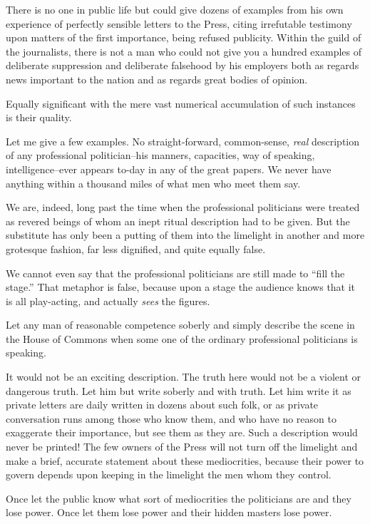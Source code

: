 \documentclass{book}
\begin{document}
There is no one in public life but could give dozens of examples from his own experience of perfectly sensible letters to the Press, citing irrefutable testimony upon matters of the first importance, being refused publicity. Within the guild of the journalists, there is not a man who could not give you a hundred examples of deliberate suppression and deliberate falsehood by his employers both as regards news important to the nation and as regards great bodies of opinion.

Equally significant with the mere vast numerical accumulation of such instances is their quality.

Let me give a few examples. No straight-forward, common-sense, \emph{real} description of any professional politician–his manners, capacities, way of speaking, intelligence–ever appears to-day in any of the great papers. We never have anything within a thousand miles of what men who meet them say.

We are, indeed, long past the time when the professional politicians were treated as revered beings of whom an inept ritual description had to be given. But the substitute has only been a putting of them into the limelight in another and more grotesque fashion, far less dignified, and quite equally false.

We cannot even say that the professional politicians are still made to “fill the stage.” That metaphor is false, because upon a stage the audience knows that it is all play-acting, and actually \emph{sees} the figures.

Let any man of reasonable competence soberly and simply describe the scene in the House of Commons when some one of the ordinary professional politicians is speaking.

It would not be an exciting description. The truth here would not be a violent or dangerous truth. Let him but write soberly and with truth. Let him write it as private letters are daily written in dozens about such folk, or as private conversation runs among those who know them, and who have no reason to exaggerate their importance, but see them as they are. Such a description would never be printed! The few owners of the Press will not turn off the limelight and make a brief, accurate statement about these mediocrities, because their power to govern depends upon keeping in the limelight the men whom they control.

Once let the public know what sort of mediocrities the politicians are and they lose power. Once let them lose power and their hidden masters lose power.
\end{document}
